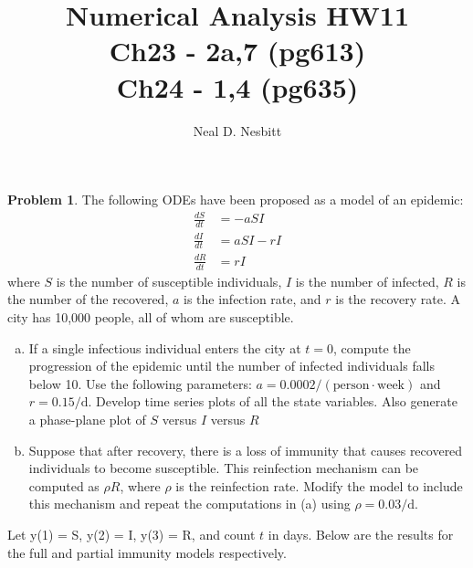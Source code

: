 \documentclass{article}
\title{Numerical Analysis HW11\\
Ch23 - 2a,7 (pg613)\\
Ch24 - 1,4 (pg635)\\}
\author{Neal D. Nesbitt}
\begin{document}
\maketitle

\theoremstyle{definition}
\newtheorem{problem}{Problem}[section]
\newtheorem{solution}{Solution}[problem]
\renewcommand*{\thesolution}{\theproblem.\alph{solution}}


\setcounter{section}{22}
\section{}

\setcounter{problem}{2}
\begin{problem}
The following ODEs have been proposed as a model of an epidemic:
\begin{align*}
\frac{dS}{dt} &= -aSI		\\
\frac{dI}{dt} &= aSI -rI	\\
\frac{dR}{dt} &= rI
\end{align*}
where $S$ is the number of susceptible individuals, $I$ is the number of infected, $R$ is the number of the recovered, $a$ is the infection rate, and $r$ is the recovery rate. A city has 10,000 people, all of whom are susceptible.
\begin{enumerate}[(a)]
\item If a single infectious individual enters the city at $t=0$, compute the progression of the epidemic until the number of infected individuals falls below 10. Use the following parameters: $a = 0.0002 /(\text{person}\cdot \text{week})$ and $r=0.15/\text{d}$. Develop time series plots of all the state variables. Also generate a phase-plane plot of $S$ versus $I$ versus $R$\\
\item Suppose that after recovery, there is a loss of immunity that causes recovered individuals to become susceptible. This reinfection mechanism can be computed as $\rho R$, where $\rho$ is the reinfection rate. Modify the model to include this mechanism and repeat the computations in (a) using $\rho=0.03/\text{d}$. 
\end{enumerate}
\end{problem}

Let y(1) = S, y(2) = I, y(3) = R, and count $t$ in days. Below are the results for the full and partial immunity models respectively. 
\end{document}
